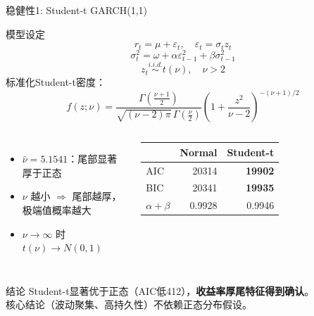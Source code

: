 \documentclass[10pt,aspectratio=169]{beamer}
\begin{document}
\begin{frame}{稳健性1: Student-t GARCH(1,1)}
  \begin{block}{模型设定}
    \[ r_t = \mu + \varepsilon_t, \quad \varepsilon_t = \sigma_t z_t \]
    \[ \sigma_t^2 = \omega + \alpha \varepsilon_{t-1}^2 + \beta \sigma_{t-1}^2 \]
    \[ z_t \stackrel{i.i.d.}{\sim} t(\nu), \quad \nu > 2 \]
    标准化Student-t密度：
    \[ f(z;\nu) = \frac{\Gamma(\frac{\nu+1}{2})}{\sqrt{(\nu-2)\pi}\,\Gamma(\frac{\nu}{2})}
    \left(1 + \frac{z^2}{\nu-2}\right)^{-(\nu+1)/2} \]
  \end{block}
  \begin{columns}
      \begin{itemize}
        \item $\hat{\nu}=5.1541$：尾部显著厚于正态
        \item $\nu$ 越小 $\Rightarrow$ 尾部越厚，极端值概率越大
        \item $\nu \to \infty$ 时 $t(\nu) \to N(0,1)$
      \end{itemize}
      \begin{table}
        \centering
        \begin{tabular}{lrr}
          \toprule
          & Normal & Student-t \\
          \midrule
          AIC & 20314 & \textbf{19902} \\
          BIC & 20341 & \textbf{19935} \\
          $\alpha+\beta$ & 0.9928 & 0.9946 \\
          \bottomrule
        \end{tabular}
      \end{table}
  \end{columns}
  \vspace{0.5em}
  \begin{block}{结论}
    Student-t显著优于正态（AIC低412），\textbf{收益率厚尾特征得到确认}。\\
    核心结论（波动聚集、高持久性）不依赖正态分布假设。
  \end{block}
\end{frame}
\end{document}
